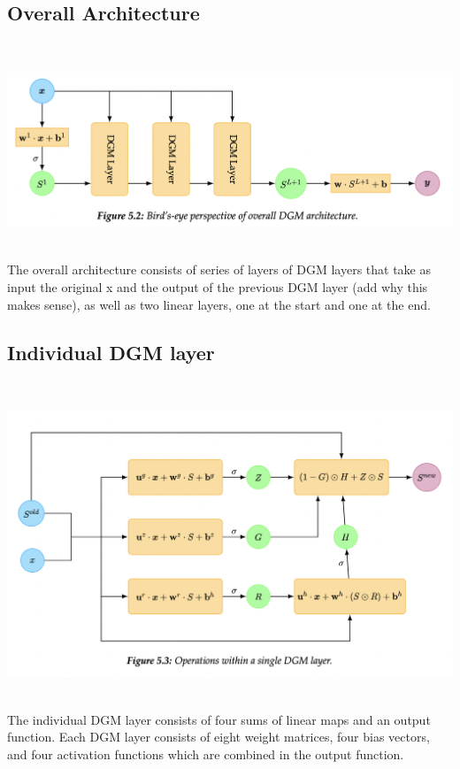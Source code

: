 \documentclass[14pt]{article}
\begin{document}
\subsection{ Overall Architecture }\\
\begin{center}
\includegraphics[scale=0.5]{Architecture.png}
\end{center}\\
The overall architecture consists of series of layers of DGM layers that take as input the original x and the output of the previous DGM layer (add why this makes sense), as well as two linear layers, one at the start and one at the end.


\subsection{ Individual DGM layer }
\\\begin{center}
\includegraphics[scale=0.5]{DGM_Layer.png}
\end{center}\\
The individual DGM layer consists of four sums of linear maps and an output function. Each DGM layer consists of eight weight matrices, four bias vectors, and four activation functions which are combined in the output function.
\end{document}
